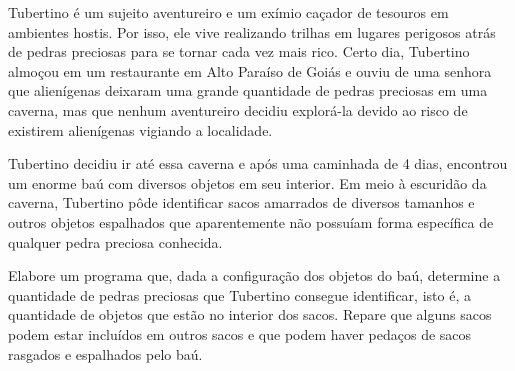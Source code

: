 Tubertino é um sujeito aventureiro e um exímio caçador de tesouros em ambientes hostis. Por isso, ele vive realizando trilhas em lugares perigosos atrás de pedras preciosas para se tornar cada vez mais rico. Certo dia, Tubertino almoçou em um restaurante em Alto Paraíso de Goiás e ouviu de uma senhora que alienígenas deixaram uma grande quantidade de pedras preciosas em uma caverna, mas que nenhum aventureiro decidiu explorá-la devido ao risco de existirem alienígenas vigiando a localidade. 

Tubertino decidiu ir até essa caverna e após uma caminhada de 4 dias, encontrou um enorme baú com diversos objetos em seu interior. Em meio à escuridão da caverna, Tubertino pôde identificar sacos amarrados de diversos tamanhos e outros objetos espalhados que aparentemente não possuíam forma específica de qualquer pedra preciosa conhecida. 

Elabore um programa que, dada a configuração dos objetos do baú, determine a quantidade de pedras preciosas que Tubertino consegue identificar, isto é, a quantidade de objetos que estão no interior dos sacos. Repare que alguns sacos podem estar incluídos em outros sacos e que podem haver pedaços de sacos rasgados e espalhados pelo baú.
